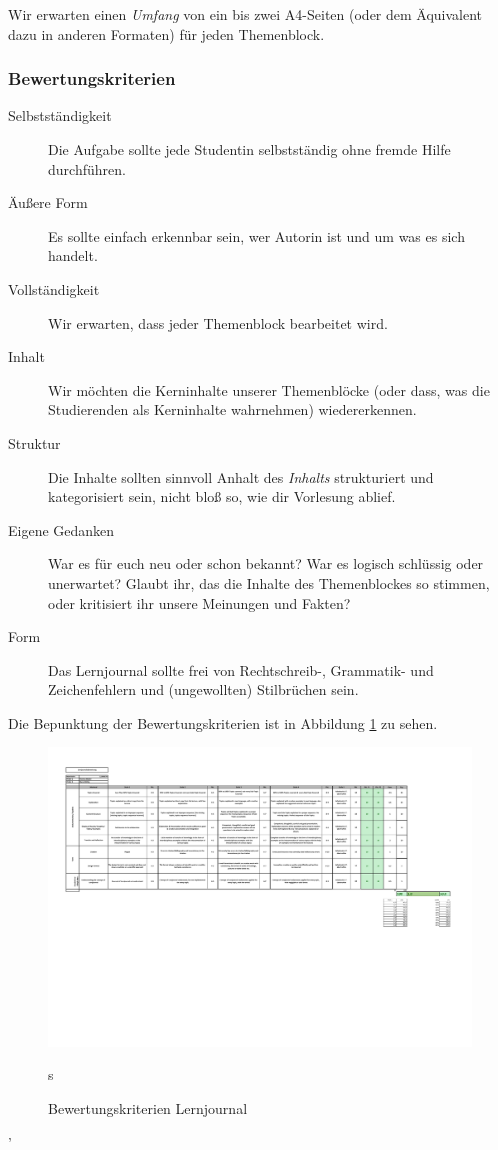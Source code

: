 \documentclass[DIV=15,headinclude]{scrartcl}
\begin{document}
Wir erwarten einen \emph{Umfang} von ein bis zwei A4-Seiten (oder dem Äquivalent dazu in anderen Formaten) für jeden Themenblock.

\subsubsection{Bewertungskriterien}

\begin{description}
	\item[Selbstständigkeit] Die Aufgabe sollte jede Studentin selbstständig ohne fremde Hilfe durchführen.
	\item[Äußere Form] Es sollte einfach erkennbar sein, wer Autorin ist und um was es sich handelt.
	\item[Vollständigkeit] Wir erwarten, dass jeder Themenblock bearbeitet wird.
	\item[Inhalt] Wir möchten die Kerninhalte unserer Themenblöcke (oder dass, was die Studierenden als Kerninhalte wahrnehmen) wiedererkennen.
	\item[Struktur] Die Inhalte sollten sinnvoll Anhalt des \emph{Inhalts} strukturiert und kategorisiert sein, nicht bloß so, wie dir Vorlesung ablief.
	\item[Eigene Gedanken] War es für euch neu oder schon bekannt? War es logisch schlüssig oder unerwartet? Glaubt ihr, das die Inhalte des Themenblockes so stimmen, oder kritisiert ihr unsere Meinungen und Fakten?
	\item[Form] Das Lernjournal sollte frei von Rechtschreib-, Grammatik- und Zeichenfehlern und (ungewollten) Stilbrüchen sein.
\end{description}

Die Bepunktung der Bewertungskriterien ist in Abbildung \ref{abb:lernjournal} zu sehen.

\begin{landscape}
\begin{figure}
  \includegraphics[width=\linewidth]{lernjournal}
  \caption{Bewertungskriterien Lernjournal}s
  \label{abb:lernjournal}
\end{figure}
\end{landscape}'
\end{document}

